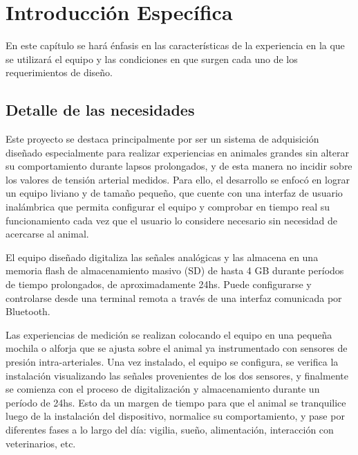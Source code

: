 \chapter{Introducción Específica} %

\label{Chapter2}


En este capítulo se hará énfasis en las características de la experiencia en la que se utilizará el equipo y las condiciones en que surgen cada uno de los requerimientos de diseño.

\section{Detalle de las necesidades}

Este proyecto se destaca principalmente por ser un sistema de adquisición diseñado especialmente para realizar experiencias en animales grandes sin alterar su comportamiento durante lapsos prolongados, y de esta manera no incidir sobre los valores de tensión arterial medidos. Para ello, el desarrollo se enfocó en lograr un equipo liviano y de tamaño pequeño, que cuente con una interfaz de usuario inalámbrica que permita configurar el equipo y comprobar en tiempo real su funcionamiento cada vez que el usuario lo considere necesario sin necesidad de acercarse al animal. 

El equipo diseñado digitaliza las señales analógicas y las almacena en una memoria flash de almacenamiento masivo (SD) de hasta 4 GB durante períodos de tiempo prolongados, de aproximadamente 24hs. Puede configurarse y controlarse desde una terminal remota a través de una interfaz comunicada por Bluetooth.

Las experiencias de medición se realizan colocando el equipo en una pequeña mochila o alforja que se ajusta sobre el animal ya instrumentado con sensores de presión intra-arteriales. Una vez instalado, el equipo se configura, se verifica la instalación visualizando las señales provenientes de los dos sensores, y finalmente se comienza con el proceso de digitalización y almacenamiento durante un período de 24hs. Esto da un margen de tiempo para que el animal se tranquilice luego de la instalación del dispositivo, normalice su comportamiento, y pase por diferentes fases a lo largo del día: vigilia, sueño, alimentación, interacción con veterinarios, etc. 

